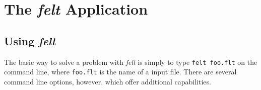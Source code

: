 
\newpage{\pagestyle{empty}\cleardoublepage}

\chapter{The {\em felt} Application}
\label{felt_prog}

\section{Using {\em felt}}
\label{felt_prog.using}

The basic way to solve a problem with {\em felt} is simply to type 
{\tt felt foo.flt} on the command line, where {\tt foo.flt} is the name of a 
\felt{} input file.  There are several command line options, however, which 
offer additional capabilities.

